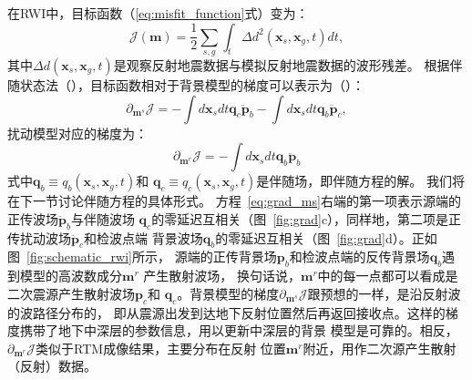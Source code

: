 在RWI中，目标函数（\ref{eq:misfit_function}式）变为：
\begin{equation}
    \mathcal{J}(\mathbf{m})=\frac{1}{2}\sum_{s,g}\int_t\Delta d^2(\mathbf{x}_s,\mathbf{x}_g,t)dt,
	\label{eq:misfit_function1}
\end{equation}
其中$\Delta d(\mathbf{x}_s,\mathbf{x}_g,t)$是观察反射地震数据与模拟反射地震数据的波形残差。
根据伴随状态法（），目标函数相对于背景模型的梯度可以表示为（）：
\begin{equation}
	\partial_{\mathbf{m}^s}\mathcal{J}=-\int d\mathbf{x}_sdt\mathbf{q}_c\ddot{\mathbf{p}}_b
	-\int d\mathbf{x}_sdt\mathbf{q}_b\ddot{\mathbf{p}}_c,
	\label{eq:grad_ms}
\end{equation}
扰动模型对应的梯度为：
\begin{equation}
	\partial_{\mathbf{m}^r}\mathcal{J}=-\int d\mathbf{x}_sdt\mathbf{q}_b\ddot{\mathbf{p}}_b
\end{equation}
式中$\mathbf{q}_b\equiv q_b(\mathbf{x}_s,\mathbf{x}_g,t)$和
$\mathbf{q}_c\equiv q_c(\mathbf{x}_s,\mathbf{x}_g,t)$是伴随场，即伴随方程的解。
我们将在下一节讨论伴随方程的具体形式。
方程~\ref{eq:grad_ms}右端的第一项表示源端的正传波场$\ddot{\mathbf{p}}_b$与伴随波场
$\mathbf{q}_c$的零延迟互相关（图~\ref{fig:grad}c），同样地，第二项是正传扰动波场$\ddot{\mathbf{p}}_c$和检波点端
背景波场$\mathbf{q}_b$的零延迟互相关（图~\ref{fig:grad}d）。正如图~\ref{fig:schematic_rwi}所示，
源端的正传背景场$\mathbf{p}_b$和检波点端的反传背景场$\mathbf{q}_b$遇到模型的高波数成分$\mathbf{m}^r$
产生散射波场，
换句话说，$\mathbf{m}^r$中的每一点都可以看成是二次震源产生散射波场$\mathbf{p}_c$和
$\mathbf{q}_c$。背景模型的梯度$\partial_{\mathbf{m}^s}\mathcal{J}$跟预想的一样，是沿反射波的波路径分布的，
即从震源出发到达地下反射位置然后再返回接收点。这样的梯度携带了地下中深层的参数信息，用以更新中深层的背景
模型是可靠的。相反，$\partial_{\mathbf{m}^r}\mathcal{J}$类似于RTM成像结果，主要分布在反射
位置$\mathbf{m}^r$附近，用作二次源产生散射（反射）数据。

\newpage
